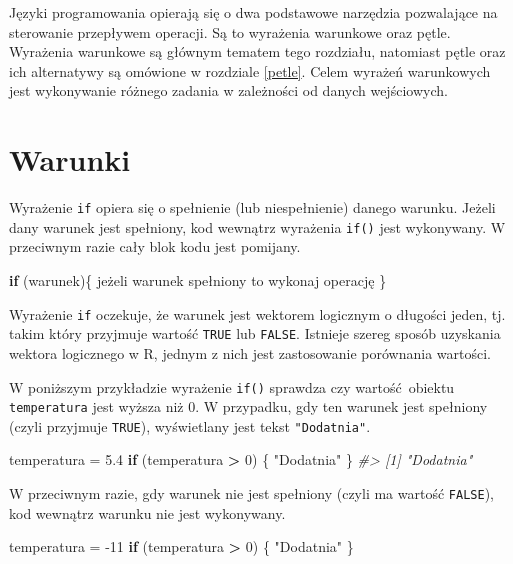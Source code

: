 \documentclass[paper=6in:9in,pagesize=pdftex,headinclude=on,footinclude=on,10pt]{scrbook}
\newenvironment{Shaded}{\begin{snugshade}}{\end{snugshade}}
\newcommand{\CommentTok}[1]{\textcolor[rgb]{0.56,0.35,0.01}{\textit{#1}}}
\newcommand{\ControlFlowTok}[1]{\textcolor[rgb]{0.13,0.29,0.53}{\textbf{#1}}}
\newcommand{\DecValTok}[1]{\textcolor[rgb]{0.00,0.00,0.81}{#1}}
\newcommand{\FloatTok}[1]{\textcolor[rgb]{0.00,0.00,0.81}{#1}}
\newcommand{\NormalTok}[1]{#1}
\newcommand{\OperatorTok}[1]{\textcolor[rgb]{0.81,0.36,0.00}{\textbf{#1}}}
\newcommand{\StringTok}[1]{\textcolor[rgb]{0.31,0.60,0.02}{#1}}
\begin{document}
Języki programowania opierają się o dwa podstawowe narzędzia pozwalające na sterowanie przepływem operacji.
Są to wyrażenia warunkowe oraz pętle.
Wyrażenia warunkowe są głównym tematem tego rozdziału, natomiast pętle oraz ich alternatywy są omówione w rozdziale \ref{petle}.
Celem wyrażeń warunkowych jest wykonywanie różnego zadania w zależności od danych wejściowych.

\hypertarget{warunki-1}{%
\section{Warunki}\label{warunki-1}}

Wyrażenie \texttt{if} opiera się o spełnienie (lub niespełnienie) danego warunku.
Jeżeli dany warunek jest spełniony, kod wewnątrz wyrażenia \texttt{if()} jest wykonywany.
W przeciwnym razie cały blok kodu jest pomijany.

\begin{Shaded}
\begin{Highlighting}[]
\ControlFlowTok{if}\NormalTok{ (warunek)\{}
\NormalTok{  jeżeli warunek spełniony to wykonaj operację}
\NormalTok{\}}
\end{Highlighting}
\end{Shaded}

Wyrażenie \texttt{if} oczekuje, że warunek jest wektorem logicznym o długości jeden, tj. takim który przyjmuje wartość \texttt{TRUE} lub \texttt{FALSE}.
Istnieje szereg sposób uzyskania wektora logicznego w R, jednym z nich jest zastosowanie porównania wartości.

W poniższym przykładzie wyrażenie \texttt{if()} sprawdza czy wartość~obiektu \texttt{temperatura} jest wyższa niż 0.
W przypadku, gdy ten warunek jest spełniony (czyli przyjmuje \texttt{TRUE}), wyświetlany jest tekst \texttt{"Dodatnia"}.

\begin{Shaded}
\begin{Highlighting}[]
\NormalTok{temperatura =}\StringTok{ }\FloatTok{5.4}
\ControlFlowTok{if}\NormalTok{ (temperatura }\OperatorTok{>}\StringTok{ }\DecValTok{0}\NormalTok{) \{}
  \StringTok{"Dodatnia"}
\NormalTok{\}}
\CommentTok{#> [1] "Dodatnia"}
\end{Highlighting}
\end{Shaded}

W przeciwnym razie, gdy warunek nie jest spełniony (czyli ma wartość \texttt{FALSE}), kod wewnątrz warunku nie jest wykonywany.

\begin{Shaded}
\begin{Highlighting}[]
\NormalTok{temperatura =}\StringTok{ }\DecValTok{-11}
\ControlFlowTok{if}\NormalTok{ (temperatura }\OperatorTok{>}\StringTok{ }\DecValTok{0}\NormalTok{) \{}
  \StringTok{"Dodatnia"}
\NormalTok{\}}
\end{Highlighting}
\end{Shaded}
\end{document}
